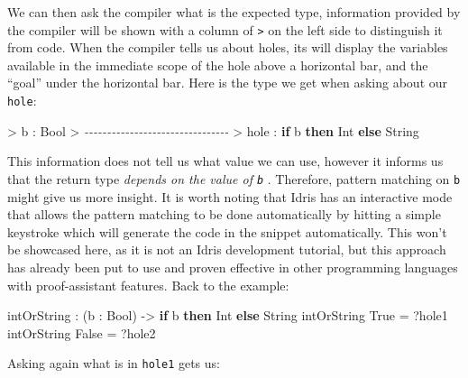 \documentclass[
]{article}
\newenvironment{Shaded}{}{}
\newcommand{\CommentTok}[1]{\textcolor[rgb]{0.38,0.63,0.69}{\textit{#1}}}
\newcommand{\DataTypeTok}[1]{\textcolor[rgb]{0.56,0.13,0.00}{#1}}
\newcommand{\KeywordTok}[1]{\textcolor[rgb]{0.00,0.44,0.13}{\textbf{#1}}}
\newcommand{\NormalTok}[1]{#1}
\newcommand{\OperatorTok}[1]{\textcolor[rgb]{0.40,0.40,0.40}{#1}}
\newcommand{\OtherTok}[1]{\textcolor[rgb]{0.00,0.44,0.13}{#1}}
\begin{document}
We can then ask the compiler what is the expected type, information
provided by the compiler will be shown with a column of
\texttt{\textgreater{}} on the left side to distinguish it from code.
When the compiler tells us about holes, its will display the variables
available in the immediate scope of the hole above a horizontal bar, and
the ``goal'' under the horizontal bar. Here is the type we get when
asking about our \texttt{hole}:

\begin{Shaded}
\begin{Highlighting}[]
\OperatorTok{\textgreater{}}\NormalTok{ b }\OperatorTok{:} \DataTypeTok{Bool}
\OperatorTok{\textgreater{}} \CommentTok{{-}{-}{-}{-}{-}{-}{-}{-}{-}{-}{-}{-}{-}{-}{-}{-}{-}{-}{-}{-}{-}{-}{-}{-}{-}{-}{-}{-}{-}{-}{-}{-}}
\OperatorTok{\textgreater{}}\NormalTok{ hole }\OperatorTok{:} \KeywordTok{if}\NormalTok{ b }\KeywordTok{then} \DataTypeTok{Int} \KeywordTok{else} \DataTypeTok{String}
\end{Highlighting}
\end{Shaded}

This information does not tell us what value we can use, however it
informs us that the return type \emph{depends on the value of
\texttt{b}} . Therefore, pattern matching on \texttt{b} might give us
more insight. It is worth noting that Idris has an interactive mode that
allows the pattern matching to be done automatically by hitting a simple
keystroke which will generate the code in the snippet automatically.
This won't be showcased here, as it is not an Idris development
tutorial, but this approach has already been put to use and proven
effective in other programming languages with proof-assistant
features\cite{tdd}\cite{agda_interactive}. Back to the example:

\begin{Shaded}
\begin{Highlighting}[]
\NormalTok{intOrString }\OperatorTok{:}\NormalTok{ (b }\OperatorTok{:} \DataTypeTok{Bool}\NormalTok{) }\OtherTok{{-}\textgreater{}} \KeywordTok{if}\NormalTok{ b }\KeywordTok{then} \DataTypeTok{Int} \KeywordTok{else} \DataTypeTok{String}
\NormalTok{intOrString }\DataTypeTok{True} \OtherTok{=} \OperatorTok{?}\NormalTok{hole1}
\NormalTok{intOrString }\DataTypeTok{False} \OtherTok{=} \OperatorTok{?}\NormalTok{hole2}
\end{Highlighting}
\end{Shaded}

Asking again what is in \texttt{hole1} gets us:
\end{document}
